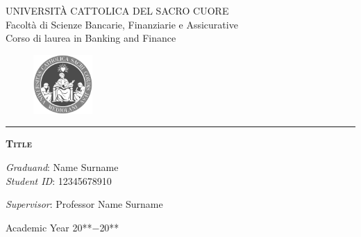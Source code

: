 
\pagestyle{empty}

\vspace*{-1.5cm}

\begin{center}
\large
UNIVERSIT\`{A} CATTOLICA DEL SACRO CUORE \\
\normalsize
Facoltà di Scienze Bancarie, Finanziarie e Assicurative \\
Corso di laurea in Banking and Finance \\

\begin{figure}[H]
  \centering
	\includegraphics[width=2.25cm]{Logo-mono.png}
  \end{figure}
\vspace*{-0.6cm}
\noindent\rule{4cm}{0.2pt}
\vspace*{2cm}
  
\huge{\textbf{\textsc{{Title}}}}

\vspace*{.75truecm}
\end{center}

\vfill
\vfill

\large

\begin{flushright}
\emph{Graduand}: Name Surname \\
\emph{Student ID}: 12345678910 \\
\end{flushright}

\noindent \emph{Supervisor}: Professor Name Surname \\



\vfill
\vfill

\begin{center}
  Academic Year 20**$-$20**
\end{center}
